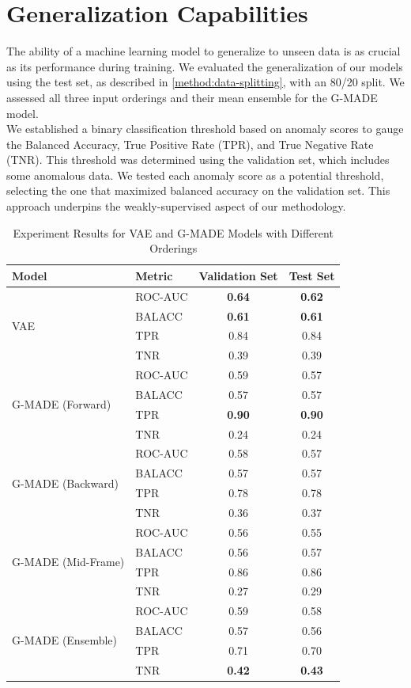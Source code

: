 \section{Generalization Capabilities}
The ability of a machine learning model to generalize to unseen data is as crucial as its performance during training. We evaluated the generalization of our models using the test set, as described in \autoref{method:data-splitting}, with an 80/20 split. We assessed all three input orderings and their mean ensemble for the G-MADE model.\\
We established a binary classification threshold based on anomaly scores to gauge the Balanced Accuracy, True Positive Rate (TPR), and True Negative Rate (TNR). This threshold was determined using the validation set, which includes some anomalous data. We tested each anomaly score as a potential threshold, selecting the one that maximized balanced accuracy on the validation set. This approach underpins the weakly-supervised aspect of our methodology.

\begin{table}[h!]
    \centering
    \caption{Experiment Results for VAE and G-MADE Models with Different Orderings}
    \begin{tabular}{|l|l|c|c|}
    \hline
    \textbf{Model} & \textbf{Metric} & \textbf{Validation Set} & \textbf{Test Set} \\
    \hline
    \multirow{4}{*}{VAE} 
    & ROC-AUC & \textbf{0.64} & \textbf{0.62} \\
    & BALACC  & \textbf{0.61} & \textbf{0.61} \\
    & TPR     & 0.84 & 0.84 \\
    & TNR     & 0.39 & 0.39 \\
    \hline
    \multirow{4}{*}{G-MADE (Forward)}
    & ROC-AUC & 0.59 & 0.57 \\
    & BALACC  & 0.57 & 0.57 \\
    & TPR     & \textbf{0.90} & \textbf{0.90} \\
    & TNR     & 0.24 & 0.24 \\
    \hline
    \multirow{4}{*}{G-MADE (Backward)}
    & ROC-AUC & 0.58 & 0.57 \\
    & BALACC  & 0.57 & 0.57 \\
    & TPR     & 0.78 & 0.78 \\
    & TNR     & 0.36 & 0.37 \\
    \hline
    \multirow{4}{*}{G-MADE (Mid-Frame)}
    & ROC-AUC & 0.56 & 0.55 \\
    & BALACC  & 0.56 & 0.57 \\
    & TPR     & 0.86 & 0.86 \\
    & TNR     & 0.27 & 0.29 \\
    \hline
    \multirow{4}{*}{G-MADE (Ensemble)}
    & ROC-AUC & 0.59 & 0.58 \\
    & BALACC  & 0.57 & 0.56 \\
    & TPR     & 0.71 & 0.70 \\
    & TNR     & \textbf{0.42} & \textbf{0.43} \\
    \hline
    \end{tabular}
\end{table}

